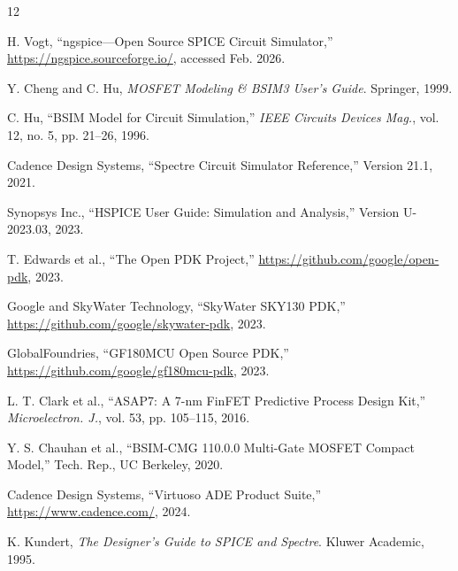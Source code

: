 \documentclass[conference]{IEEEtran}
\begin{document}
\balance

\begin{thebibliography}{12}

H. Vogt, ``ngspice---Open Source SPICE Circuit Simulator,'' 
\url{https://ngspice.sourceforge.io/}, accessed Feb. 2026.

Y. Cheng and C. Hu, \textit{MOSFET Modeling \& BSIM3 User's Guide}. 
Springer, 1999.

C. Hu, ``BSIM Model for Circuit Simulation,'' 
\textit{IEEE Circuits Devices Mag.}, vol. 12, no. 5, pp. 21--26, 1996.

Cadence Design Systems, ``Spectre Circuit Simulator Reference,''
Version 21.1, 2021.

Synopsys Inc., ``HSPICE User Guide: Simulation and Analysis,''
Version U-2023.03, 2023.

T. Edwards et al., ``The Open PDK Project,''
\url{https://github.com/google/open-pdk}, 2023.

Google and SkyWater Technology, ``SkyWater SKY130 PDK,''
\url{https://github.com/google/skywater-pdk}, 2023.

GlobalFoundries, ``GF180MCU Open Source PDK,''
\url{https://github.com/google/gf180mcu-pdk}, 2023.

L. T. Clark et al., ``ASAP7: A 7-nm FinFET Predictive Process Design Kit,''
\textit{Microelectron. J.}, vol. 53, pp. 105--115, 2016.

Y. S. Chauhan et al., ``BSIM-CMG 110.0.0 Multi-Gate MOSFET Compact Model,''
Tech. Rep., UC Berkeley, 2020.

Cadence Design Systems, ``Virtuoso ADE Product Suite,''
\url{https://www.cadence.com/}, 2024.

K. Kundert, \textit{The Designer's Guide to SPICE and Spectre}.
Kluwer Academic, 1995.

\end{thebibliography}
\end{document}
